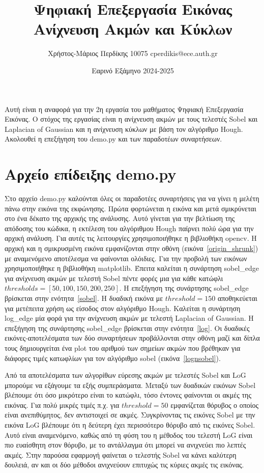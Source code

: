 \documentclass{article}
\title{Ψηφιακή Επεξεργασία Εικόνας \\ Ανίχνευση Ακμών και Κύκλων}
\date{Εαρινό Εξάμηνο 2024-2025}
\author{Χρήστος-Μάριος Περδίκης 10075 cperdikis@ece.auth.gr}
\begin{document}
\maketitle

 
Αυτή είναι η αναφορά για την 2η εργασία του μαθήματος Ψηφιακή Επεξεργασία 
Εικόνας. Ο στόχος της εργασίας είναι η ανίχνευση ακμών με τους τελεστές Sobel
και Laplacian of Gaussian και η ανίχνευση κύκλων με βάση τον αλγόριθμο Hough.
Ακολουθεί η επεξήγηση του demo.py και των παραδοτέων συναρτή\-σεων.

\section{Αρχείο επίδειξης demo.py}
Στο αρχείο demo.py καλούνται όλες οι παραδοτέες συναρτήσεις για να γίνει η 
μελέτη πάνω στην εικόνα της εκφώνησης. Πρώτα φορτώνεται η εικόνα και μετά 
σμικρύνεται στο ένα δέκατο της αρχικής της ανάλυσης. Αυτό γίνεται για την βελτίωση
της απόδοσης του κώδικα, η εκτέλεση του αλγόριθμου Hough παίρνει πολύ ώρα για την
αρχική ανάλυση. Για αυτές τις λειτουργίες χρησιμοποιήθηκε η βιβλιοθήκη
opencv. Η αρχική και η σμικρυσμένη εικόνα εμφανίζονται στην οθόνη 
(εικόνα~\ref{origin_shrunk}) με αναμενόμενο 
αποτέλεσμα να φαίνονται ολόιδιες. Για την προβολή των εικόνων 
χρησιμοποιήθηκε η βιβλιοθήκη matplotlib. Έπειτα καλείται η συνάρτηση  sobel\_edge 
για ανίχνευση ακμών 
με τελεστή Sobel πέντε φορές μια για κάθε κατώφλι $thresholds = \left[50,100,150,
200,250\right]$. Η επεξήγηση της συνάρτησης sobel\_edge βρίσκεται στην 
ενότητα~\ref{sobel}. Η δυαδική εικόνα με $threshold = 150$ αποθηκεύεται για μετέπειτα
χρήση ως είσοδος στον αλγόριθμο Hough. Καλείται η συνάρτηση log\_edge μία φορά 
για την ανίχνευση ακμών με
τελεστή Laplacian of Gaussian. Η επεξήγηση της συνάρτησης sobel\_edge βρίσκεται στην 
ενότητα~\ref{log}. Οι δυαδικές εικόνες-αποτελέσματα των δύο συναρτήσεων 
προβάλλονται στην οθόνη μαζί και δίπλα τους δημιουργείται
ένα plot του αριθμού των σημείων ακμών που βρέθηκαν για διάφορες τιμές κατωφλίων
για τον αλγόριθμο sobel (εικόνα~\ref{lognsobel}). 

Από τα αποτελέσματα των αλγορίθων εύρεσης ακμών με τελεστές Sobel και LoG 
μπορούμε να εξάγουμε τα εξής συμπεράσματα. 
Μεταξύ των δυαδικών εικόνων Sobel βλέπουμε ότι όσο μικρότερο είναι το κατώφλι,
τόσο έντονες φαίνονται οι ακμές της εικόνας. Για πολύ μικρές τιμές 
π.χ. για $threshold = 50$ εμφανίζεται θόρυβος ο οποίος είναι ανεπιθύμητος, δεν 
αντιστοιχεί σε ακμές. Συγκρίνοντας τις εικόνες Sobel με την εικόνα LoG βλέπουμε
ότι η δεύτερη έχει περισσότερο θόρυβο από τις εικόνες 
Sobel. Αυτό είναι αναμενόμενο, καθώς από τη φύση του η μέθοδος του τελεστή LoG
είναι πιο ευαίσθητη στον θόρυβο, με το αντάλλαγμα ότι μπορεί να ανιχνεύει πιο 
λεπτές ακμές. Στην παρούσα εφαρμογή φαίνεται ο τελεστής Sobel να κάνει καλύτερη
δουλειά, αν και οι δύο μέθοδοι ανιχνεύουν επιτυχώς τις κύριες ακμές τις εικόνας.
\end{document}
